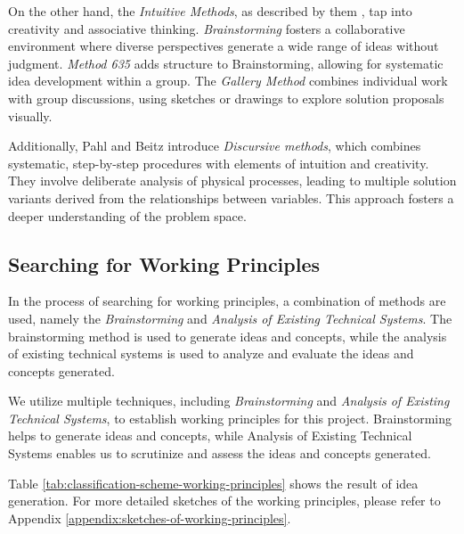 On the other hand, the \textit{Intuitive Methods}, as described by them \cite{Pahl07h}, tap into creativity and associative thinking. \textit{Brainstorming} fosters a collaborative environment where diverse perspectives generate a wide range of ideas without judgment. \textit{Method 635} adds structure to Brainstorming, allowing for systematic idea development within a group. The \textit{Gallery Method} combines individual work with group discussions, using sketches or drawings to explore solution proposals visually.

Additionally, Pahl and Beitz \cite{Pahl07i} introduce \textit{Discursive methods}, which combines systematic, step-by-step procedures with elements of intuition and creativity. They involve deliberate analysis of physical processes, leading to multiple solution variants derived from the relationships between variables. This approach fosters a deeper understanding of the problem space.

\subsection{Searching for Working Principles}
In the process of searching for working principles, a combination of methods are used, namely the \textit{Brainstorming} and \textit{Analysis of Existing Technical Systems}. The brainstorming method is used to generate ideas and concepts, while the analysis of existing technical systems is used to analyze and evaluate the ideas and concepts generated.

We utilize multiple techniques, including \textit{Brainstorming} and \textit{Analysis of Existing Technical Systems}, to establish working principles for this project. Brainstorming helps to generate ideas and concepts, while Analysis of Existing Technical Systems enables us to scrutinize and assess the ideas and concepts generated.

Table \ref{tab:classification-scheme-working-principles} shows the result of idea generation. For more detailed sketches of the working principles, please refer to Appendix \ref{appendix:sketches-of-working-principles}.

